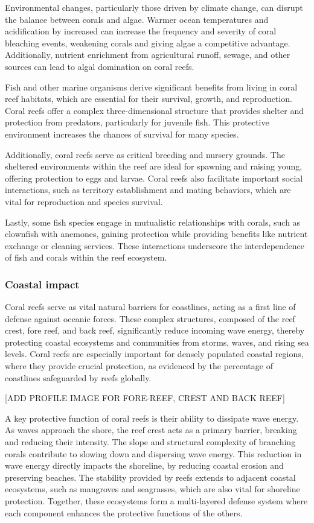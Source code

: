 Environmental changes, particularly those driven by climate change, can disrupt the balance between corals and algae. Warmer ocean temperatures and acidification by increased  can increase the frequency and severity of coral bleaching events, weakening corals and giving algae a competitive advantage. Additionally, nutrient enrichment from agricultural runoff, sewage, and other sources can lead to algal domination on coral reefs. 

Fish and other marine organisms derive significant benefits from living in coral reef habitats, which are essential for their survival, growth, and reproduction. Coral reefs offer a complex three-dimensional structure that provides shelter and protection from predators, particularly for juvenile fish. This protective environment increases the chances of survival for many species.

Additionally, coral reefs serve as critical breeding and nursery grounds. The sheltered environments within the reef are ideal for spawning and raising young, offering protection to eggs and larvae. Coral reefs also facilitate important social interactions, such as territory establishment and mating behaviors, which are vital for reproduction and species survival.

Lastly, some fish species engage in mutualistic relationships with corals, such as clownfish with anemones, gaining protection while providing benefits like nutrient exchange or cleaning services. These interactions underscore the interdependence of fish and corals within the reef ecosystem. 


\subsubsection{Coastal impact}
Coral reefs serve as vital natural barriers for coastlines, acting as a first line of defense against oceanic forces. These complex structures, composed of the reef crest, fore reef, and back reef, significantly reduce incoming wave energy, thereby protecting coastal ecosystems and communities from storms, waves, and rising sea levels. Coral reefs are especially important for densely populated coastal regions, where they provide crucial protection, as evidenced by the percentage of coastlines safeguarded by reefs globally.

[ADD PROFILE IMAGE FOR FORE-REEF, CREST AND BACK REEF]

A key protective function of coral reefs is their ability to dissipate wave energy. As waves approach the shore, the reef crest acts as a primary barrier, breaking and reducing their intensity. The slope and structural complexity of branching corals contribute to slowing down and dispersing wave energy. This reduction in wave energy directly impacts the shoreline, by reducing coastal erosion and preserving beaches. The stability provided by reefs extends to adjacent coastal ecosystems, such as mangroves and seagrasses, which are also vital for shoreline protection. Together, these ecosystems form a multi-layered defense system where each component enhances the protective functions of the others.

